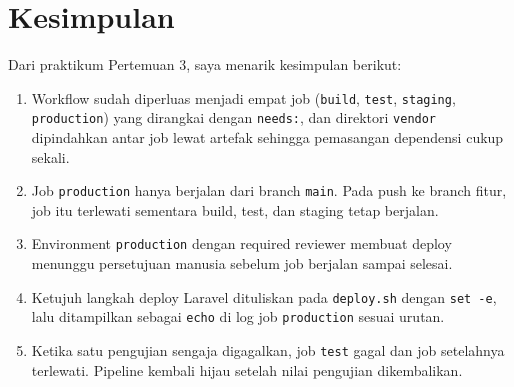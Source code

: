 \documentclass[a4paper,oneside,12pt]{report}
\begin{document}
\clearpage

\chapter{Kesimpulan}
Dari praktikum Pertemuan 3, saya menarik kesimpulan berikut:

\begin{enumerate}
    \item Workflow sudah diperluas menjadi empat job (\texttt{build}, \texttt{test}, \texttt{staging}, \texttt{production}) yang dirangkai dengan \texttt{needs:}, dan direktori \texttt{vendor} dipindahkan antar job lewat artefak sehingga pemasangan dependensi cukup sekali.
    \item Job \texttt{production} hanya berjalan dari branch \texttt{main}. Pada push ke branch fitur, job itu terlewati sementara build, test, dan staging tetap berjalan.
    \item Environment \texttt{production} dengan required reviewer membuat deploy menunggu persetujuan manusia sebelum job berjalan sampai selesai.
    \item Ketujuh langkah deploy Laravel dituliskan pada \texttt{deploy.sh} dengan \texttt{set -e}, lalu ditampilkan sebagai \texttt{echo} di log job \texttt{production} sesuai urutan.
    \item Ketika satu pengujian sengaja digagalkan, job \texttt{test} gagal dan job setelahnya terlewati. Pipeline kembali hijau setelah nilai pengujian dikembalikan.
\end{enumerate}
\end{document}
